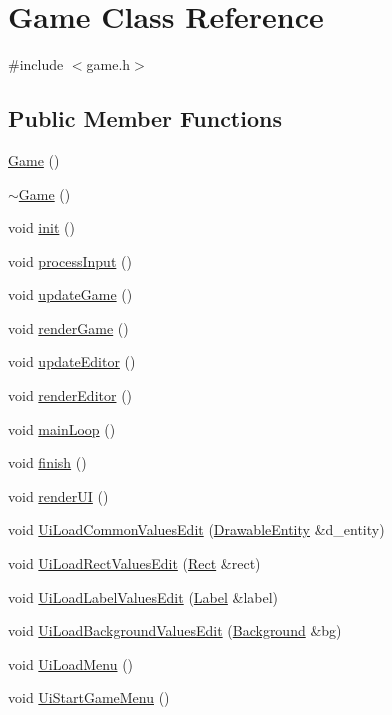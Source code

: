 \hypertarget{class_game}{}\section{Game Class Reference}
\label{class_game}


{\ttfamily \#include $<$game.\+h$>$}

\subsection*{Public Member Functions}
\begin{DoxyCompactItemize}
\item 
\hyperlink{class_game_ad59df6562a58a614fda24622d3715b65}{Game} ()
\item 
\hyperlink{class_game_ae3d112ca6e0e55150d2fdbc704474530}{$\sim$\+Game} ()
\item 
void \hyperlink{class_game_a6f3a33940524b6ba9d83f627ccb14bbf}{init} ()
\item 
void \hyperlink{class_game_a815a3ec2787b4b1c4077d28165c380e8}{process\+Input} ()
\item 
void \hyperlink{class_game_a67a8c5c0356c9ad33fac1abc435a3746}{update\+Game} ()
\item 
void \hyperlink{class_game_a4573580347746dbb7dbe568383682ed3}{render\+Game} ()
\item 
void \hyperlink{class_game_a81abd2f677aba0c3f068c902d690e2fb}{update\+Editor} ()
\item 
void \hyperlink{class_game_a204ea65111892ca826f3a65cc8818ea7}{render\+Editor} ()
\item 
void \hyperlink{class_game_ae89e277761b7dc5bc7a23fd1b4c6f17d}{main\+Loop} ()
\item 
void \hyperlink{class_game_a4a803542276ea0497ad3a87b8983dd67}{finish} ()
\item 
void \hyperlink{class_game_a828811993f0d93a72758b05c98609540}{render\+UI} ()
\item 
void \hyperlink{class_game_a0a41188d1bfa82e9e0cdda1c0530a389}{Ui\+Load\+Common\+Values\+Edit} (\hyperlink{class_drawable_entity}{Drawable\+Entity} \&d\+\_\+entity)
\item 
void \hyperlink{class_game_a8710233ba10c51897d95b176f1bac5ca}{Ui\+Load\+Rect\+Values\+Edit} (\hyperlink{class_rect}{Rect} \&rect)
\item 
void \hyperlink{class_game_a895e8ae5390fcd21a903623a23ceeaac}{Ui\+Load\+Label\+Values\+Edit} (\hyperlink{class_label}{Label} \&label)
\item 
void \hyperlink{class_game_a65b1b506f6c9ffb4006e94680e05cd04}{Ui\+Load\+Background\+Values\+Edit} (\hyperlink{class_background}{Background} \&bg)
\item 
void \hyperlink{class_game_a184082948455436281839a2e96279e17}{Ui\+Load\+Menu} ()
\item 
void \hyperlink{class_game_aa18ae3db4c6d5b2fac2080afcd8e6790}{Ui\+Start\+Game\+Menu} ()
\end{DoxyCompactItemize}
